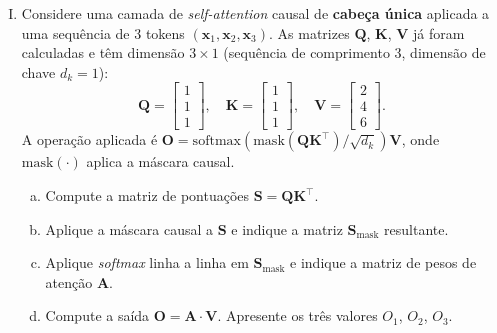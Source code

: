\documentclass{dlproblemset}
\begin{document}
\begin{enumerate}[I)]
\begin{enumerate}[a)]
        \item ( )\,V \quad ( )\,F \quad O algoritmo BPE inicia com um vocabulário pequeno (caracteres ou \textit{bytes} individuais) e cresce iterativamente o vocabulário fundindo o par de tokens \emph{menos} frequente, até atingir o tamanho-alvo do vocabulário.

        \item ( )\,V \quad ( )\,F \quad \textit{Multi-Query Attention} (MQA) usa $H$ cabeças independentes para Q, K e V; portanto, reduzir o número de cabeças \emph{de Q} é a forma de diminuir o tamanho do \textit{KV-cache} durante a inferência.
    \end{enumerate}

    \item Considere uma camada de \textit{self-attention} causal de \textbf{cabeça única} aplicada a uma sequência de 3 tokens $(\mathbf{x}_1, \mathbf{x}_2, \mathbf{x}_3)$. As matrizes $\mathbf{Q}$, $\mathbf{K}$, $\mathbf{V}$ já foram calculadas e têm dimensão $3 \times 1$ (sequência de comprimento 3, dimensão de chave $d_k = 1$):
    \[
        \mathbf{Q} = \begin{bmatrix} 1 \\ 1 \\ 1 \end{bmatrix},\quad
        \mathbf{K} = \begin{bmatrix} 1 \\ 1 \\ 1 \end{bmatrix},\quad
        \mathbf{V} = \begin{bmatrix} 2 \\ 4 \\ 6 \end{bmatrix}.
    \]
    A operação aplicada é $\mathbf{O} = \mathrm{softmax}\!\left(\mathrm{mask}(\mathbf{Q}\mathbf{K}^\top)/\sqrt{d_k}\right) \mathbf{V}$, onde $\mathrm{mask}(\cdot)$ aplica a máscara causal.

    \begin{enumerate}[a)]
        \item Compute a matriz de pontuações $\mathbf{S} = \mathbf{Q}\mathbf{K}^\top$.

        \item Aplique a máscara causal a $\mathbf{S}$ e indique a matriz $\mathbf{S}_\text{mask}$ resultante.

        \item Aplique \textit{softmax} linha a linha em $\mathbf{S}_\text{mask}$ e indique a matriz de pesos de atenção $\mathbf{A}$.

        \item Compute a saída $\mathbf{O} = \mathbf{A} \cdot \mathbf{V}$. Apresente os três valores $O_1$, $O_2$, $O_3$.
    \end{enumerate}

\end{enumerate}
\end{document}

